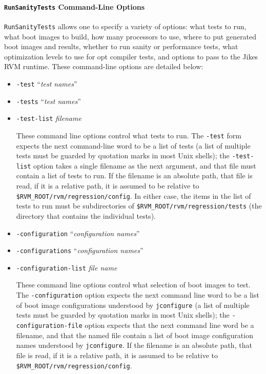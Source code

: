 \paragraph{{\tt{RunSanityTests}} Command-Line Options}

 {\tt{RunSanityTests}} allows one to specify a variety of options:
what tests to run, what boot images to build, how many processors to
use, where to put generated boot images and results, whether to run
sanity or performance tests, what optimization levels to use for opt
compiler tests, and options to pass to the Jikes RVM runtime.  These
command-line options are detailed below:

\begin{itemize}
\item{\tt{-test}} ``{\em{test names}}''
\item{\tt{-tests}} ``{\em{test names}}''
\item{\tt{-test-list}} {\em{filename}}

 These command line options control what tests to run.  The
{\tt{-test}} form expects the next command-line word to be a list
of tests (a list of multiple tests must be guarded by quotation marks
in most Unix shells); the {\tt{-test-list}} option takes a single
filename as the next argument, and that file must contain a list of
tests to run.  If the filename is an absolute path, that file is read,
if it is a relative path, it is assumed to be relative to
{\tt \$RVM\_\-ROOT/rvm/regression/config}.  In either case, the items in the
list of tests to run must be subdirectories of
{\tt \$RVM\_\-ROOT/rvm/regression/tests} (the directory that contains the
individual tests).

\item{\tt{-configuration}} ``{\em{configuration names}}''
\item{\tt{-configurations}} ``{\em{configuration names}}''
\item{\tt{-configuration-list}} {\em{file name}}

These command line options control what selection of boot images to
test.  The \texttt{-con\-fi\-gu\-ra\-tion} option expects the next command
line word to be a list of boot image configurations understood by
\texttt{jconfigure} (a list of multiple tests must be guarded by quotation
marks in most Unix\Rweb{} shells); the {\tt{-configuration-file}} option
expects that the next command line word be a filename, and that the
named file contain a list of boot image configuration names understood
by \texttt{jconfigure}.  If the filename is an absolute path, that file is
read, if it is a relative path, it is assumed to be relative to
{\tt \$RVM\_\-ROOT/rvm/regression/config}.


\end{itemize}
